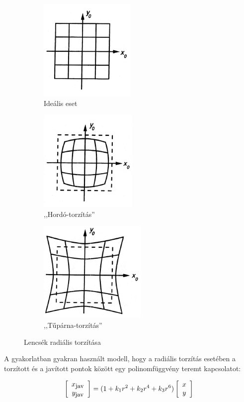 \begin{figure}[tbh]
\centering
\begin{subfigure}[b]{.32\linewidth}
	\centering
	\includegraphics{figures/dist-1.png}
	\caption{Ideális eset}
  \end{subfigure}
\begin{subfigure}[b]{.32\linewidth}
	\centering
	\includegraphics{figures/dist-2.png}
	\caption{,,Hordó-torzítás''}
  \end{subfigure}
\begin{subfigure}[b]{.32\linewidth}
	\centering
	\includegraphics{figures/dist-3.png}
	\caption{,,Tűpárna-torzítás''}
  \end{subfigure}
\caption{Lencsék radiális torzítása \cite{distortion} \label{fig:radial-distortion}}
\end{figure}

A gyakorlatban gyakran használt modell, hogy a radiális torzítás esetében a torzított és a javított pontok között egy polinomfüggvény teremt kapcsolatot:

\[\left[\begin{array}{c}x_{\hbox{\small jav}}\\ y_{\hbox{\small jav}}\end{array}\right] = (1 + k_1r^2 + k_2r^4 + k_3r^6) \left[\begin{array}{c}x\\y\end{array}\right]\]

